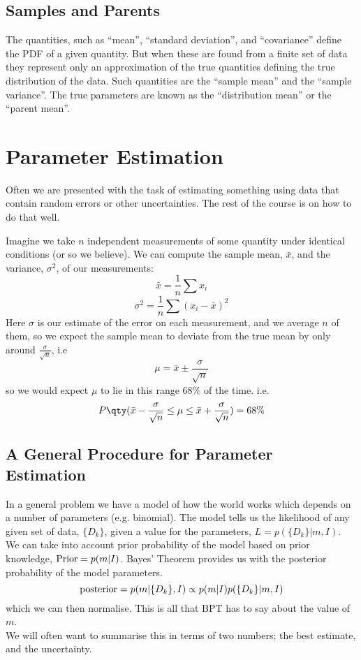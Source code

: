 \documentclass{dwnotes}         		        %
\begin{document}
\subsection{Samples and Parents}
\label{sec:samples-parents}

The quantities, such as ``mean'', ``standard deviation'', and
``covariance'' define the PDF of a given quantity. But when these are
found from a finite set of data they represent only an approximation
of the true quantities defining the true distribution of the
data. Such quantities are the ``sample mean'' and the ``sample
variance''. The true parameters are known as the ``distribution mean''
or the ``parent mean''.

\section{Parameter Estimation}
\label{sec:estimationpar}

Often we are presented with the task of estimating something using
data that contain random errors or other uncertainties. The rest of
the course is on how to do that well.

Imagine we take $n$ independent measurements of some quantity under
identical conditions (or so we believe). We can compute the sample
mean, $\bar{x}$, and the variance, $\sigma^2$, of our measurements:
\[ \bar{x} = \frac{1}{n} \sum x_i \]
\[ \sigma^2 = \frac{1}{n} \sum (x_i - \bar{x})^2 \] Here $\sigma$ is
our estimate of the error on each measurement, and we average $n$ of
them, so we expect the sample mean to deviate from the true mean by
only around $\frac{\sigma}{\sqrt{n}}$, i.e\
\[ \mu = \bar{x} \pm \frac{\sigma}{\sqrt{n}} \] so we would expect
$\mu$ to lie in this range 68\% of the time.  i.e.\ \[P \qty(\bar{x}-
\frac{\sigma}{\sqrt{n}} \le \mu \le \bar{x} + \frac{\sigma}{\sqrt{n}})
= 68\% \]

\subsection{A General Procedure for Parameter Estimation}
\label{sec:genproc}

In a general problem we have a model of how the world works which
depends on a number of parameters (e.g. binomial). The model tells us
the likelihood of any given set of data, $\{D_k\}$, given a value for
the parameters, $L = p(\{D_k\} | m,I)$. We can take into account prior
probability of the model based on prior knowledge, ${\rm Prior} =
p(m|I)$. Bayes' Theorem provides us with the posterior probability of
the model parameters.
\[ {\rm posterior} = p(m|\{D_k\}, I) \propto p(m|I) p(\{D_k\}|m,I) \]
which we can then normalise. This is all that BPT has to say about the
value of $m$.\\
We will often want to summarise this in terms of two numbers; the best
estimate, and the uncertainty.
\end{document}

